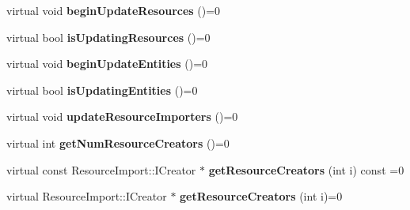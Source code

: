\begin{DoxyCompactItemize}
\item 
virtual void {\bfseries begin\+Update\+Resources} ()=0\hypertarget{class_i_dream_sky_1_1_project_model_base_af008da4b11b3dc22428466791e138f9a}{}\label{class_i_dream_sky_1_1_project_model_base_af008da4b11b3dc22428466791e138f9a}

\item 
virtual bool {\bfseries is\+Updating\+Resources} ()=0\hypertarget{class_i_dream_sky_1_1_project_model_base_acdcad5e575545f1ba751ebccf3ec300a}{}\label{class_i_dream_sky_1_1_project_model_base_acdcad5e575545f1ba751ebccf3ec300a}

\item 
virtual void {\bfseries begin\+Update\+Entities} ()=0\hypertarget{class_i_dream_sky_1_1_project_model_base_a038c18b2ce29f10955be80b9afed602d}{}\label{class_i_dream_sky_1_1_project_model_base_a038c18b2ce29f10955be80b9afed602d}

\item 
virtual bool {\bfseries is\+Updating\+Entities} ()=0\hypertarget{class_i_dream_sky_1_1_project_model_base_abc04f55ec0552297c6c453be95d4539c}{}\label{class_i_dream_sky_1_1_project_model_base_abc04f55ec0552297c6c453be95d4539c}

\item 
virtual void {\bfseries update\+Resource\+Importers} ()=0\hypertarget{class_i_dream_sky_1_1_project_model_base_a03fc80ef2dd14bfcbeab7746708c25e5}{}\label{class_i_dream_sky_1_1_project_model_base_a03fc80ef2dd14bfcbeab7746708c25e5}

\item 
virtual int {\bfseries get\+Num\+Resource\+Creators} ()=0\hypertarget{class_i_dream_sky_1_1_project_model_base_ad47f6082618ee81f2e88bf92b99a9449}{}\label{class_i_dream_sky_1_1_project_model_base_ad47f6082618ee81f2e88bf92b99a9449}

\item 
virtual const Resource\+Import\+::\+I\+Creator $\ast$ {\bfseries get\+Resource\+Creators} (int i) const  =0\hypertarget{class_i_dream_sky_1_1_project_model_base_a7f7938d8c7ade20a031e93d4392fe2ea}{}\label{class_i_dream_sky_1_1_project_model_base_a7f7938d8c7ade20a031e93d4392fe2ea}

\item 
virtual Resource\+Import\+::\+I\+Creator $\ast$ {\bfseries get\+Resource\+Creators} (int i)=0\hypertarget{class_i_dream_sky_1_1_project_model_base_a4c4f7c7af42db841bb15baf2483b30ad}{}\label{class_i_dream_sky_1_1_project_model_base_a4c4f7c7af42db841bb15baf2483b30ad}


\end{DoxyCompactItemize}
